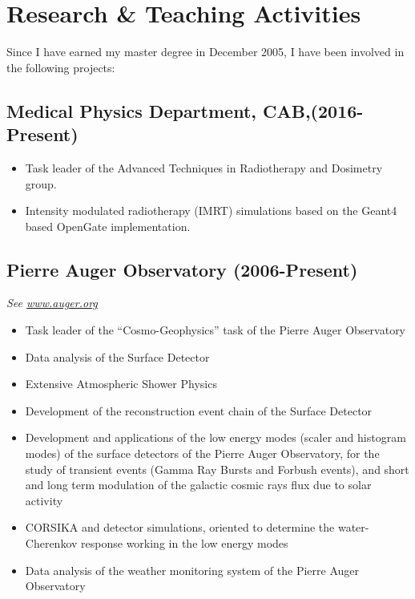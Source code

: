 \ifeng
\section*{Research \& Teaching Activities}

Since I have earned my master degree in December 2005, I have been involved in the following projects:

\subsection*{Medical Physics Department, CAB,(2016-Present)}
\begin{itemize}
	\item Task leader of the Advanced Techniques in Radiotherapy and Dosimetry
		group.
	\item Intensity modulated radiotherapy (IMRT) simulations based on the
		Geant4 based OpenGate implementation.
\end{itemize}

\subsection*{Pierre Auger Observatory (2006-Present)}
{\small{\textit{See \href{http://www.auger.org/}{www.auger.org}}}}
\begin{itemize}
\item Task leader of the ``Cosmo-Geophysics'' task of the Pierre Auger Observatory
\item Data analysis of the Surface Detector
\item Extensive Atmospheric Shower Physics
\item Development of the reconstruction event chain of the Surface Detector
\item Development and applications of the low energy modes (scaler and histogram
modes) of the surface detectors of the Pierre Auger Observatory, for the study
of transient events (Gamma Ray Bursts and Forbush events), and short and long
term modulation of the galactic cosmic rays flux due to solar activity
\item CORSIKA and detector simulations, oriented to determine the
water-Cherenkov response working in the low energy modes
\item Data analysis of the weather monitoring system of the Pierre Auger
Observatory
\end{itemize}

